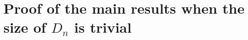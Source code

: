 \documentclass{article}
\numberwithin{equation}{section}
\newcommand{\DD}{\mbox{${\mathcal D}$}}
\newcommand{\1}{\mathbf{1}}
\newcommand{\0}{\mathbf{0}}
\begin{document}



\section{Proof of the main results when the size of $D_n$ is trivial}
\label{Sec: Proof_D_n_trivial}
\end{document}
